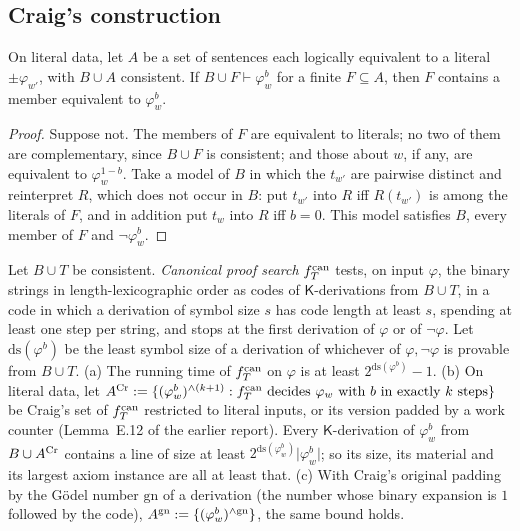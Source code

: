 \subsection{Craig's construction}\label{app:terms:craig}

\begin{lemma}\label{lem:terms:recheck}
On literal data, let $A$ be a set of sentences each logically equivalent to a literal $\pm\varphi_{w'}$, with $B\cup A$ consistent. If $B\cup F\vdash\varphi_w^b$ for a finite $F\subseteq A$, then $F$ contains a member equivalent to $\varphi_w^b$.
\end{lemma}

\begin{proof}
Suppose not. The members of $F$ are equivalent to literals; no two of them are complementary, since $B\cup F$ is consistent; and those about $w$, if any, are equivalent to $\varphi_w^{1-b}$. Take a model of $B$ in which the $t_{w'}$ are pairwise distinct and reinterpret $R$, which does not occur in $B$: put $t_{w'}$ into $R$ iff $R(t_{w'})$ is among the literals of $F$, and in addition put $t_w$ into $R$ iff $b=0$. This model satisfies $B$, every member of $F$ and $\neg\varphi_w^b$.
\end{proof}

\begin{lemma}\label{lem:terms:unary}
Let $B\cup T$ be consistent. \emph{Canonical proof search} $f^{\rm can}_T$ tests, on input $\varphi$, the binary strings in length-lexicographic order as codes of $\mathsf K$-derivations from $B\cup T$, in a code in which a derivation of symbol size $s$ has code length at least $s$, spending at least one step per string, and stops at the first derivation of $\varphi$ or of $\neg\varphi$. Let $\mathrm{ds}(\varphi^b)$ be the least symbol size of a derivation of whichever of $\varphi,\neg\varphi$ is provable from $B\cup T$.
(a) The running time of $f^{\rm can}_T$ on $\varphi$ is at least $2^{\mathrm{ds}(\varphi^b)}-1$.
(b) On literal data, let $A^{\rm Cr}:=\{(\varphi_w^b)^{\wedge(k+1)}:f^{\rm can}_T\text{ decides }\varphi_w\text{ with }b\text{ in exactly }k\text{ steps}\}$ be Craig's set of $f^{\rm can}_T$ restricted to literal inputs, or its version padded by a work counter (Lemma~E.12 of the earlier report). Every $\mathsf K$-derivation of $\varphi_w^b$ from $B\cup A^{\rm Cr}$ contains a line of size at least $2^{\mathrm{ds}(\varphi_w^b)}\lvert\varphi_w^b\rvert$; so its size, its material and its largest axiom instance are all at least that.
(c) With Craig's original padding by the Gödel number $\mathrm{gn}$ of a derivation (the number whose binary expansion is $1$ followed by the code), $A^{\rm gn}:=\{(\varphi_w^b)^{\wedge\mathrm{gn}}\}$, the same bound holds.
\end{lemma}

